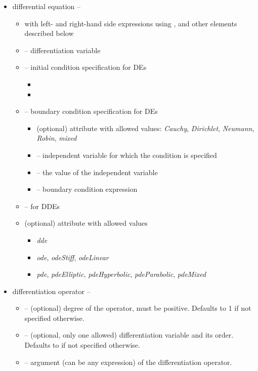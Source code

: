 \begin{itemize}
\item 
differential equation -- 
\begin{itemize}
\item 
{} with left- and right-hand side expressions
using ,  and other elements described below
\item
{} -- differentiation variable 
\item 
{} -- initial condition specification for DEs
\begin{itemize}
\item 
{}
\item 
{}
\end{itemize}

\item 
{} -- boundary condition specification for DEs
\begin{itemize}
\item 
{} (optional) attribute with allowed values: \textit{Cauchy}, \textit{Dirichlet}, \textit{Neumann}, \textit{Robin}, \textit{mixed}
\item 
{} -- independent variable for which the condition is specified
\item 
{} -- the value of the independent variable
\item 
{} -- boundary condition expression
\end{itemize}
\item 
{} -- for DDEs
\item 
{} (optional) attribute with allowed values 
\begin{itemize}
\item 
\textit{dde}
\item 
\textit{ode}, \textit{odeStiff}, \textit{odeLinear}
\end{itemize}
\begin{itemize}
\item 
\textit{pde}, \textit{pdeElliptic}, \textit{pdeHyperbolic}, \textit{pdeParabolic}, \textit{pdeMixed}
\end{itemize}
\end{itemize}

\item
differentiation operator -- 
\begin{itemize}
\item 
{} -- (optional) degree of the operator, must be positive. Defaults to 1
if not specified otherwise.
\item
{} -- (optional, only one allowed) differentiation variable and its order. Defaults to 
 if not specified otherwise.
\item
{} -- argument (can be any expression) of the differentiation operator.
\end{itemize}


\end{itemize}
